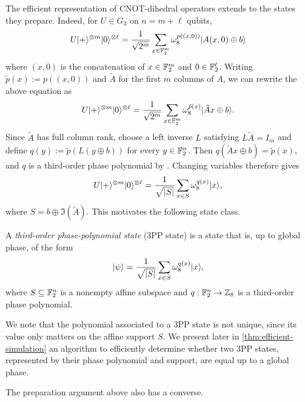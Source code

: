 The efficient representation of CNOT-dihedral operators extends to the states they prepare. Indeed, for $U\in G_3$ on $n=m+\ell$ qubits,
\begin{align}
    U|+\rangle^{\otimes m} |0\rangle^{\otimes \ell} = \frac{1}{\sqrt{2^m}}\sum_{x \in \mathbb{F}_2^m} \omega_8^{p((x,0))} |A(x,0) \oplus b\rangle
\end{align}
where $(x,0)$ is the concatenation of $x \in \mathbb{F}_2^m$ and $0 \in \mathbb{F}_2^\ell$. Writing $\tilde{p}(x):= p((x,0))$ and $\tilde{A}$ for the first $m$ columns of $A$, we can rewrite the above equation as
\begin{align}
    U|+\rangle^{\otimes m} |0\rangle^{\otimes \ell} = \frac{1}{\sqrt{2^m}}\sum_{x \in \mathbb{F}_2^m} \omega_8^{\tilde{p}(x)} |\tilde{A}x \oplus b\rangle.
\end{align}
Since $\tilde{A}$ has full column rank, choose a left inverse $L$ satisfying $L\tilde{A}=I_m$ and define $q(y):=\tilde p(L(y\oplus b))$ for every $y\in\mathbb{F}_2^n$. Then $q(\tilde{A}x\oplus b)=\tilde p(x)$, and $q$ is a third-order phase polynomial by . Changing variables therefore gives
\begin{align}
    U|+\rangle^{\otimes m} |0\rangle^{\otimes \ell} = \frac{1}{\sqrt{|S|}}\sum_{x \in S} \omega_8^{q(x)} |x\rangle,
\end{align}
where $S = b \oplus \Im(\tilde{A})$. This motivates the following state class.

\begin{definition}[3PP states]\label{def:3pp}
    A \emph{third-order phase-polynomial state} (3PP state) is a state that is, up to global phase, of the form
    \begin{align}
        |\psi\rangle = \frac{1}{\sqrt{|S|}} \sum_{x \in S} \omega_8^{q(x)} |x\rangle,
    \end{align}
    where $S \subseteq \mathbb{F}_2^n$ is a nonempty affine subspace and $q:\mathbb{F}_2^n\to\mathbb{Z}_8$ is a third-order phase polynomial.
\end{definition}

We note that the polynomial associated to a 3PP state is not unique, since its value only matters on the affine support $S$. We present later in \cref{thm:efficient-simulation} an algorithm to efficiently determine whether two 3PP states, represented by their phase polynomial and support, are equal up to a global phase.

The preparation argument above also has a converse.

